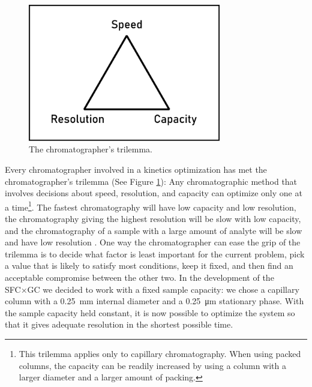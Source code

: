 \begin{figure}
\centering
\includegraphics[width=0.75\textwidth]{Figures/Triangle.pdf}
\decoRule
\caption[Schematic diagram of a the chromatographer's trilemma.]{The chromatographer's trilemma.}
\label{fig:trilemma}
\end{figure}


Every chromatographer involved in a kinetics optimization has met the
chromatographer's trilemma (See Figure \ref{fig:trilemma}): Any chromatographic
method that involves decisions about speed, resolution, and capacity can
optimize only one at a time\footnote{This trilemma applies only to capillary
chromatography. When using packed columns, the capacity can be readily increased
by using a column with a larger diameter and a larger amount of packing.}. The
fastest chromatography will have low capacity and low resolution, the
chromatography giving the highest resolution will be slow with low capacity, and
the chromatography of a sample with a large amount of analyte will be slow
and have low resolution \autocite{Klee2002}. One way the chromatographer can
ease the grip of the trilemma is to decide what factor is least important for
the current problem, pick a value that is likely to satisfy most
conditions, keep it fixed, and then find an acceptable compromise between the
other two. In the development of the SFC×GC we decided to work with a fixed
sample capacity: we chose a capillary column with a \SI{0.25}{\milli\metre}
internal diameter and a \SI{0.25}{\micro\metre} stationary phase. With the
sample capacity held constant, it is now possible to optimize the system so that
it gives adequate resolution in the shortest possible time.


